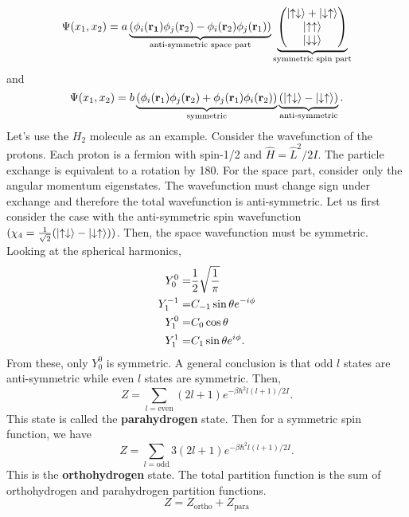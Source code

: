     \begin{equation}
        \Psi(x_1,x_2)=a\underbrace{(\phi_i(\mathbf{r_1})\phi_j(\mathbf{r}_2)-\phi_i(\mathbf{r}_2)\phi_j(\mathbf{r}_1))}_\text{anti-symmetric space part}\underbrace{\begin{pmatrix}
            \left| \uparrow\downarrow \right>+\left| \downarrow\uparrow \right> \\
            \left| \uparrow\uparrow \right>\\
            \left| \downarrow\downarrow \right>
        \end{pmatrix}}_\text{symmetric spin part}
    \end{equation}
    and
    \begin{equation}
        \Psi(x_1,x_2) = b\underbrace{(\phi_i(\mathbf{r}_1)\phi_j(\mathbf{r}_2)+\phi_j(\mathbf{r}_1)\phi_i(\mathbf{r}_2))}_\text{symmetric}\underbrace{(\left| \uparrow\downarrow \right>-\left| \downarrow\uparrow \right>)}_\text{anti-symmetric}.
    \end{equation}
    Let's use the $H_2$ molecule as an example. Consider the wavefunction of the protons. Each proton is a fermion with spin-1/2 and $\hat{H}=\hat{L}^2/2I$. The particle exchange is equivalent to a rotation by 180\textdegree. For the space part, consider only the angular momentum eigenstates. The wavefunction must change sign under exchange and therefore the total wavefunction is anti-symmetric. Let us first consider the case with the anti-symmetric spin wavefunction $(\chi_4 = \frac{1}{\sqrt{2}}(\left| \uparrow\downarrow \right>-\left| \downarrow\uparrow \right>))$. Then, the space wavefunction must be symmetric. Looking at the spherical harmonics,
    \begin{align*}
        Y_0^0 =& \frac{1}{2}\sqrt{\frac{1}{\pi}}\\
        Y_1^{-1} =& C_{-1}\sin\theta e^{-i\phi}\\
        Y_1^0=&C_0\cos\theta \\
        Y_1^1=&C_1\sin\theta e^{i\phi}.
    \end{align*}
    From these, only $Y_0^0$ is symmetric. A general conclusion is that odd $l$ states are anti-symmetric while even $l$ states are symmetric. Then,
    \begin{equation}
        Z = \sum_{l=\text{even}}(2l+1)e^{-\beta\hbar^2l(l+1)/2I}.
    \end{equation}
    This state is called the \textbf{parahydrogen} state. Then for a symmetric spin function, we have
    \begin{equation}
        Z = \sum_{l=\text{odd}}3(2l+1)e^{-\beta\hbar^2l(l+1)/2I}.
    \end{equation}
    This is the \textbf{orthohydrogen} state. The total partition function is the sum of orthohydrogen and parahydrogen partition functions.
    \begin{equation}
        Z = Z_\text{ortho}+Z_\text{para}
    \end{equation}